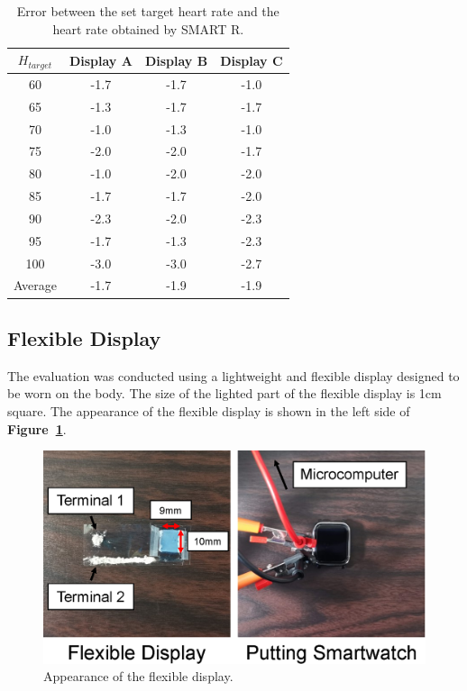 \documentclass[sigchi,authordraft]{acmart}
\newcommand\figref[1]{\textbf{Figure~\ref{fig:#1}}}
\begin{document}
\begin{table}[!t]
  \centering
  \caption{Error between the set target heart rate and the heart rate obtained by SMART R.}
  \begin{tabular}{c|c|c|c} \hline\hline
    $H_{target}$ & Display A & Display B & Display C \\ \hline
    60 & -1.7 & -1.7 & -1.0 \\
    65 & -1.3 & -1.7 & -1.7 \\
    70 & -1.0 & -1.3 & -1.0 \\
    75 & -2.0 & -2.0 & -1.7 \\
    80 & -1.0 & -2.0 & -2.0 \\
    85 & -1.7 & -1.7 & -2.0 \\
    90 & -2.3 & -2.0 & -2.3 \\
    95 & -1.7 & -1.3 & -2.3 \\
    100 & -3.0 & -3.0 & -2.7 \\ \hline
    Average & -1.7 & -1.9 & -1.9 \\ \hline
  \end{tabular}
  \label{tab:original_result}
\end{table}


\subsection{Flexible Display}
The evaluation was conducted using a lightweight and flexible display designed to be worn on the body.
The size of the lighted part of the flexible display is 1cm square. The appearance of the flexible display is shown in the left side of \figref{flexible}.\par

\begin{figure}[!t]
  \centering
  \includegraphics[width=1\linewidth]{figures/flexible.eps}
  \caption{Appearance of the flexible display.}
  \label{fig:flexible}
\end{figure}
\end{document}
